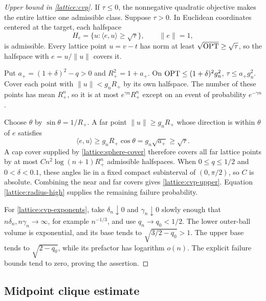 \begin{proof}[Upper bound in \cref{lattice:cvp}]
If $\tau\le0$, the nonnegative quadratic objective makes the entire
lattice one admissible class. Suppose $\tau>0$. In Euclidean coordinates
centered at the target, each halfspace
\begin{equation*}
 H_e=\{u:\langle e,u\rangle\ge\sqrt\tau\},\qquad\|e\|=1,
\end{equation*}
is admissible. Every lattice point $u=v-t$ has norm at least
$\sqrt{\operatorname{OPT}}\ge\sqrt\tau$, so the halfspace with $e=u/\|u\|$ covers it.

Put $a_+=(1+\delta)^2-q>0$ and $R_+^2=1+a_+$. On
$\operatorname{OPT}\le(1+\delta)^2g_n^2$, $\tau\le a_+g_n^2$. Cover each point with
$\|u\|<g_nR_+$ by its own halfspace. The number of these points has mean
$R_+^n$, so it is at most $e^{\gamma n}R_+^n$ except on an event of
probability $e^{-\gamma n}$.

Choose $\theta$ by $\sin\theta=1/R_+$. A far point
$\|u\|\ge g_nR_+$ whose direction is within $\theta$ of $e$ satisfies
\begin{equation*}
 \langle e,u\rangle\ge g_nR_+\cos\theta
 =g_n\sqrt{a_+}\ge\sqrt\tau.
\end{equation*}
A cap cover supplied by \cref{lattice:sphere-cover} therefore covers all
far lattice points by at most
$C n^2\log(n+1)R_+^n$ admissible halfspaces. When
$0\le q\le1/2$ and $0<\delta<0.1$, these angles lie in a fixed compact
subinterval of $(0,\pi/2)$, so $C$ is absolute. Combining the near and
far covers gives \eqref{lattice:cvp-upper}. Equation
\eqref{lattice:radius-high} supplies the remaining failure probability.

For \eqref{lattice:cvp-exponents}, take $\delta_n\downarrow0$ and
$\gamma_n\downarrow0$ slowly enough that $n\delta_n,n\gamma_n\to\infty$,
for example $n^{-1/3}$, and use $q_n\to q_0<1/2$. The lower outer-ball
volume is exponential, and its base tends to $\sqrt{3/2-q_0}>1$.
The upper base tends to $\sqrt{2-q_0}$, while its prefactor has logarithm
$o(n)$. The explicit failure bounds tend to zero, proving the assertion.
\end{proof}

\subsection{Midpoint clique estimate}
\label{app:lattice:clique-proof}

